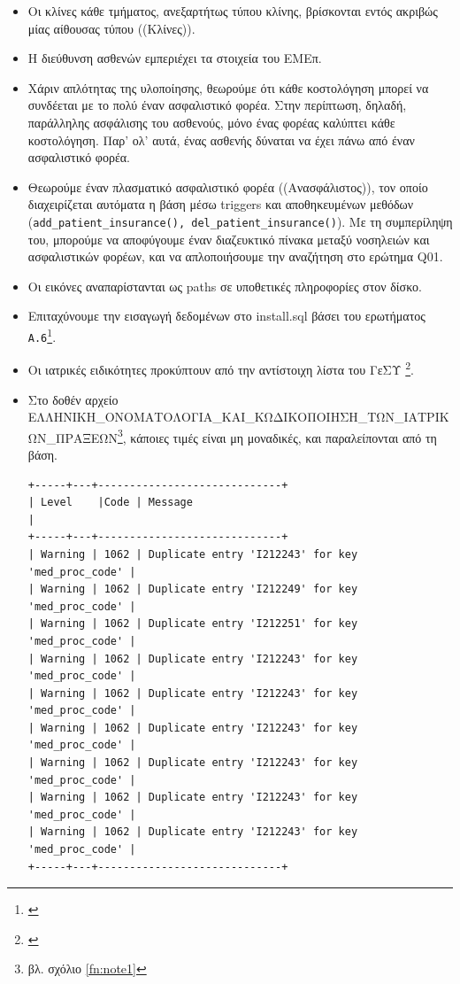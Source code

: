 \documentclass[13pt]{article}
\newcommand{\eng}[1]{\foreignlanguage{english}{#1}}
\newcommand{\langeng}{\selectlanguage{english}}
\newcommand{\langgrc}{\selectlanguage{greek}}
\begin{document}
\begin{itemize}
\item
    Οι κλίνες κάθε τμήματος, ανεξαρτήτως τύπου κλίνης, βρίσκονται εντός ακριβώς μίας αίθουσας τύπου ((Κλίνες)).
\item
Η διεύθυνση ασθενών εμπεριέχει τα στοιχεία του ΕΜΕπ.
\item
    Χάριν απλότητας της υλοποίησης, θεωρούμε ότι κάθε κοστολόγηση μπορεί να συνδέεται με το πολύ έναν ασφαλιστικό φορέα. Στην περίπτωση, δηλαδή, παράλληλης ασφάλισης του ασθενούς, μόνο ένας φορέας καλύπτει κάθε κοστολόγηση. Παρ' ολ' αυτά, ένας ασθενής δύναται να έχει πάνω από έναν ασφαλιστικό φορέα.
\item
    Θεωρούμε έναν πλασματικό ασφαλιστικό φορέα ((Ανασφάλιστος)), τον οποίο διαχειρίζεται αυτόματα η βάση μέσω \eng{triggers} και αποθηκευμένων μεθόδων (\eng{\texttt{add\_patient\_insurance(), del\_patient\_insurance()}}). Με τη συμπερίληψη του, μπορούμε να αποφύγουμε έναν διαζευκτικό πίνακα μεταξύ νοσηλειών και ασφαλιστικών φορέων, και να απλοποιήσουμε την αναζήτηση στο ερώτημα \eng{Q01}.
\item
    Οι εικόνες αναπαρίστανται ως \eng{paths} σε υποθετικές πληροφορίες στον δίσκο.
\item
    Επιταχύνουμε την εισαγωγή δεδομένων στο \eng{install.sql} βάσει του ερωτήματος \texttt{A.6}\footnote{\eng{\urlworkbench}}.
\item
    Οι ιατρικές ειδικότητες προκύπτουν από την αντίστοιχη λίστα του ΓεΣΥ \footnote{\eng{\urlgesy}}.
\item
    Στο δοθέν αρχείο ΕΛΛΗΝΙΚΗ\_ΟΝΟΜΑΤΟΛΟΓΙΑ\_ΚΑΙ\_ΚΩΔΙΚΟΠΟΙΗΣΗ\_ΤΩΝ\_ΙΑΤΡΙΚΩΝ\_ΠΡΑΞΕΩΝ\footnote{βλ. σχόλιο \ref{fn:note1}}, κάποιες τιμές είναι μη μοναδικές, και παραλείπονται από τη βάση.
\langeng
\begin{lstlisting}
+-----+---+-----------------------------+
| Level    |Code | Message                                            |
+-----+---+-----------------------------+
| Warning | 1062 | Duplicate entry 'I212243' for key 'med_proc_code' |
| Warning | 1062 | Duplicate entry 'I212249' for key 'med_proc_code' |
| Warning | 1062 | Duplicate entry 'I212251' for key 'med_proc_code' |
| Warning | 1062 | Duplicate entry 'I212243' for key 'med_proc_code' |
| Warning | 1062 | Duplicate entry 'I212243' for key 'med_proc_code' |
| Warning | 1062 | Duplicate entry 'I212243' for key 'med_proc_code' |
| Warning | 1062 | Duplicate entry 'I212243' for key 'med_proc_code' |
| Warning | 1062 | Duplicate entry 'I212243' for key 'med_proc_code' |
| Warning | 1062 | Duplicate entry 'I212243' for key 'med_proc_code' |
+-----+---+-----------------------------+
\end{lstlisting}
\langgrc


\end{itemize}
\end{document}
